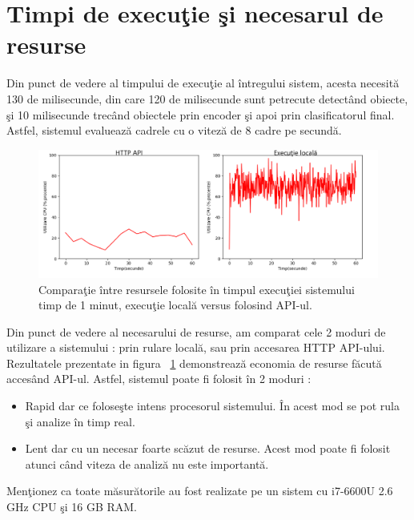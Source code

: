 \documentclass[a4paper,12pt]{report}
\begin{document}
\section {Timpi de execuţie şi necesarul de resurse}
\quad Din punct de vedere al timpului de execuţie al întregului sistem, acesta necesită 130 de milisecunde, din care 120 de milisecunde sunt petrecute detectând obiecte, şi 10 milisecunde trecând obiectele prin encoder şi apoi prin clasificatorul final. Astfel, sistemul evaluează cadrele cu o viteză de  8 cadre pe secundă. 
\begin{figure}[h]
\begin{center}
        \includegraphics[width = 1\textwidth]{images/comparatie_cpu_usage}
			 \caption{Comparaţie între resursele folosite în timpul execuţiei sistemului timp de 1 minut, execuţie locală versus folosind API-ul.}
			 \label{fig:comparatie_cpu}
\end{center}
\end{figure}
\par Din punct de vedere al necesarului de resurse, am comparat cele 2 moduri de utilizare a sistemului : prin rulare locală, sau prin accesarea HTTP API-ului. 
Rezultatele prezentate in figura ~\ref{fig:comparatie_cpu} demonstrează economia de resurse făcută accesând API-ul. Astfel, sistemul poate fi folosit în 2 moduri : 
\begin{itemize}
\item Rapid dar ce foloseşte intens procesorul sistemului. În acest mod se pot rula şi analize în timp real.
\item Lent dar cu un necesar foarte scăzut de resurse. Acest mod poate fi folosit atunci când viteza de analiză nu este importantă.
\end{itemize}
\par Menţionez ca toate măsurătorile au fost realizate pe un sistem cu i7-6600U 2.6 GHz CPU şi 16 GB RAM.

\listoffigures
\listoftables

\end{document}
